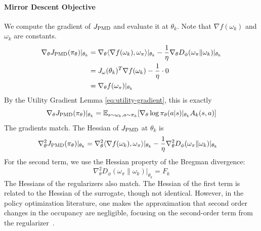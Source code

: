 \documentclass{article}
\theoremstyle{plain}
\theoremstyle{definition}
\theoremstyle{remark}
\begin{document}
\paragraph{Mirror Descent Objective}
We compute the gradient of $J_{\textup{PMD}}$ and evaluate it at $\theta_k$. 
Note that $\nabla f(\omega_k)$ and $\omega_k$ are constants.
\begin{align*}
    \nabla_\theta J_{\textup{PMD}}(\pi_\theta) |_{\theta_k} &= \nabla_\theta \langle \nabla f(\omega_k), \omega_\pi \rangle |_{\theta_k} - \frac{1}{\eta} \nabla_\theta D_\phi(\omega_\pi \| \omega_k) |_{\theta_k} \\
    &= J_\omega(\theta_k)^T \nabla f(\omega_k) - \frac{1}{\eta} \cdot 0 \\
    &= \nabla_\theta f(\omega_\pi)|_{\theta_k}
\end{align*}
By the Utility Gradient Lemma \ref{eq:utility-gradient}, this is exactly 
$$ \nabla_\theta J_{\textup{PMD}}(\pi_\theta) |_{\theta_k} = \mathbb{E}_{s \sim \omega_k, a \sim \pi_k} [\nabla_\theta \log \pi_\theta(a|s)|_{\theta_k} A_k(s,a)] $$
The gradients match.
The Hessian of $J_{\textup{PMD}}$ at $\theta_k$ is
\begin{align*}
    \nabla^2_\theta J_{\textup{PMD}}(\pi_\theta) |_{\theta_k} &= \nabla^2_\theta \langle \nabla f(\omega_k), \omega_\pi \rangle |_{\theta_k} - \frac{1}{\eta} \nabla^2_\theta D_\phi(\omega_\pi \| \omega_k) |_{\theta_k}
\end{align*}
For the second term, we use the Hessian property of the Bregman divergence:
$$ \nabla^2_\theta D_\phi(\omega_\pi \| \omega_k) |_{\theta_k} = F_k $$
The Hessians of the regularizers also match. 
The Hessian of the first term is related to the Hessian of the surrogate, though not identical. 
However, in the policy optimization literature, one makes the approximation that second order changes in the occupancy are negligible, focusing on the second-order term from the regularizer~\citep{kakade2002Approximately, schulman2017trust}.
\end{document}
